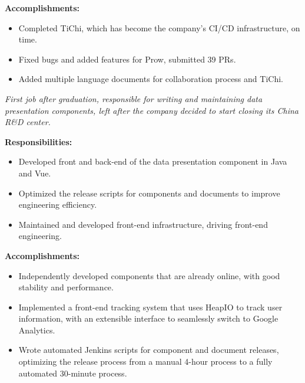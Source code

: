 \documentclass{resume}
\newcommand{\en}[1]{#1}
\newcommand{\zh}[1]{}
\begin{document}
\en{\textbf{Accomplishments:}}
\zh{\textbf{产出：}}
\begin{itemize}
      \item \en{Completed TiChi, which has become the company’s CI/CD infrastructure, on time.}
            \zh{按时完成了项目的设计和开发，TiChi 已经成为了公司 CI/CD 的基础设施。}
      \item \en{Fixed bugs and added features for Prow, submitted 39 PRs.}
            \zh{为 Prow 修复 bug 和添加功能，提交了 39 个 PR。}
      \item \en{Added multiple language documents for collaboration process and TiChi.}
            \zh{为 TiChi 编写了良好的文档，明确了协作流程，为开源贡献者提供了更好的协作体验。}
\end{itemize}

\en{}
\zh{\datedsubsection{\textbf{\href{https://www.morningstar.com/}{晨星资讯（Morningstar, Inc.）- 金融服务 - 前后端开发工程师}}}{2019/06 -- 2020/07}}
\en{\textsl{First job after graduation, responsible for writing and maintaining data presentation components, left after the company decided to start closing its China R\&D center.}}
\zh{\textsl{毕业后第一份工作，负责编写和维护数据展示组件，在公司决定开始关闭中国研发中心后离职。}}

\en{\textbf{Responsibilities:}}
\zh{\textbf{职责：}}
\begin{itemize}
      \item \en{Developed front and back-end of the data presentation component in Java and Vue.}
            \zh{负责数据展示组件的前后端开发，使用 Java 和 Vue 开发。}
      \item \en{Optimized the release scripts for components and documents to improve engineering efficiency.}
            \zh{负责组件和文档发布脚本的优化，提升工程效率。}
      \item \en{Maintained and developed front-end infrastructure, driving front-end engineering.}
            \zh{负责前端基础设施维护和开发，尝试和推动前端工程化。}
\end{itemize}

\en{\textbf{Accomplishments:}}
\zh{\textbf{产出：}}
\begin{itemize}
      \item \en{Independently developed components that are already online, with good stability and performance.}
            \zh{多个独立开发的组件已经上线使用，有较好的稳定性和性能。}
      \item \en{Implemented a front-end tracking system that uses HeapIO to track user information, with an extensible interface to seamlessly switch to Google Analytics.}
            \zh{实现了前端的 tracking 系统，使用 HeapIO 追踪用户信息，并预留可扩展接口，可无缝切换至 Google Analytics。}
      \item \en{Wrote automated Jenkins scripts for component and document releases, optimizing the release process from a manual 4-hour process to a fully automated 30-minute process.}
            \zh{为组件和文档发布编写了自动化 Jenkins 脚本，将发布流程从手动 4 小时优化到全自动 30 分钟。}
\end{itemize}
\end{document}
